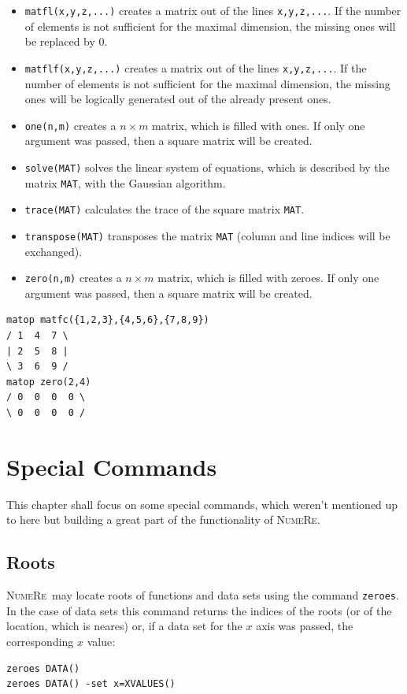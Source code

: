 \documentclass[DIV=14,headsepline,footsepline]{scrbook}
\newcommand{\NR}{\textsc{Nu\-me\-Re}}
\begin{document}
\begin{itemize}
					\item \lstinline+matfl(x,y,z,...)+ creates a matrix out of the lines \lstinline+x,y,z,...+. If the number of elements is not sufficient for the maximal dimension, the missing ones will be replaced by 0.
					\item \lstinline+matflf(x,y,z,...)+ creates a matrix out of the lines \lstinline+x,y,z,...+. If the number of elements is not sufficient for the maximal dimension, the missing ones will be logically generated out of the already present ones.
					\item \lstinline+one(n,m)+ creates a $n \times m$ matrix, which is filled with ones. If only one argument was passed, then a square matrix will be created.
					\item \lstinline+solve(MAT)+ solves the linear system of equations, which is described by the matrix \lstinline+MAT+, with the Gaussian algorithm.
					\item \lstinline+trace(MAT)+ calculates the trace of the square matrix \lstinline+MAT+.
					\item \lstinline+transpose(MAT)+ transposes the matrix \lstinline+MAT+ (column and line indices will be exchanged).
					\item \lstinline+zero(n,m)+ creates a $n \times m$ matrix, which is filled with zeroes. If only one argument was passed, then a square matrix will be created.
				\end{itemize}
				\begin{lstlisting}
matop matfc({1,2,3},{4,5,6},{7,8,9})
/ 1  4  7 \
| 2  5  8 |
\ 3  6  9 /
matop zero(2,4)
/ 0  0  0  0 \
\ 0  0  0  0 /
				\end{lstlisting}
		\chapter{Special Commands}
			This chapter shall focus on some special commands, which weren't mentioned up to here but building a great part of the functionality of \NR.
			\section{Roots}
				\NR\ may locate roots of functions and data sets using the command \lstinline+zeroes+\cmd{zeroes}. In the case of data sets this command returns the indices of the roots (or of the location, which is neares) or, if a data set for the $x$ axis was passed, the corresponding $x$ value:
				\begin{lstlisting}
zeroes DATA()
zeroes DATA() -set x=XVALUES()
				\end{lstlisting}
				
\end{document}
